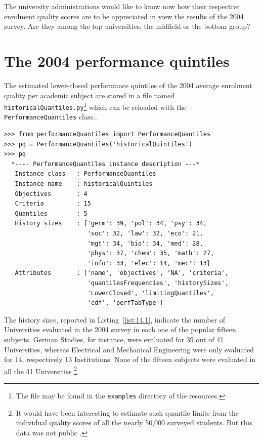 The university administrations would like to know now how their respective enrolment quality scores are to be appreciated in view the results of the 2004 \Spiegel survey. Are they among the top universities, the midfield or the bottom group?

\section{The 2004 performance quintiles}
\label{sec:14.2}

The estimated lower-closed performance quintiles of the 2004 average enrolment quality per academic subject are stored in a file named \texttt{historicalQuan\-tiles.py}\footnote{The file may be found in the \texttt{examples} directory of the \Digraph resources.} which can be reloaded with the \texttt{PerformanceQuantiles} class..
\begin{lstlisting}[caption={Inspecting stored historical performance quantiles},label=list:14.1]
>>> from performanceQuantiles import PerformanceQuantiles
>>> pq = PerformanceQuantiles('historicalQuintiles')
>>> pq
  *---- PerformanceQuantiles instance description ---*
   Instance class   : PerformanceQuantiles
   Instance name    : historicalQuintiles
   Objectives       : 4
   Criteria         : 15
   Quantiles        : 5
   History sizes    : {'germ': 39, 'pol': 34, 'psy': 34,
                       'soc': 32, 'law': 32, 'eco': 21,
                       'mgt': 34, 'bio': 34, 'med': 28,
                       'phys': 37, 'chem': 35, 'math': 27,
                       'info': 33, 'elec': 14, 'mec': 13}
   Attributes       : ['name', 'objectives', 'NA', 'criteria',
                       'quantilesFrequencies', 'historySizes',
                       'LowerClosed', 'limitingQuantiles',
                       'cdf', 'perfTabType']
\end{lstlisting}

The history sizes, reported in Listing~\vref{list:14.1}, indicate the number of Universities evaluated in the 2004 survey in each one of the popular fifteen subjects. German Studies, for instance, were evaluated for 39 out of 41 Universities, whereas Electrical and Mechanical Engineering were only evaluated for 14, respectively 13 Institutions. None of the fifteen subjects were evaluated in all the 41 Universities \footnote{It would have been interesting to estimate such quantile limits from the individual quality scores of all the nearly 50,000 surveyed students. But this data was not public \citep{SPI-2004}.}.                      

